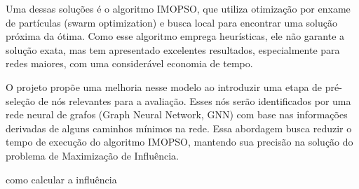 \documentclass[12pt]{article}
\begin{document}
Uma dessas soluções é o algoritmo IMOPSO, que utiliza otimização por enxame de partículas (swarm optimization) e busca local para encontrar uma solução próxima da ótima. Como esse algoritmo emprega heurísticas, ele não garante a solução exata, mas tem apresentado excelentes resultados, especialmente para redes maiores, com uma considerável economia de tempo.

O projeto propõe uma melhoria nesse modelo ao introduzir uma etapa de pré-seleção de nós relevantes para a avaliação. Esses nós serão identificados por uma rede neural de grafos (Graph Neural Network, GNN) com base nas informações derivadas de alguns caminhos mínimos na rede. Essa abordagem busca reduzir o tempo de execução do algoritmo IMOPSO, mantendo sua precisão na solução do problema de Maximização de Influência.

como calcular a influência 







\end{document}

